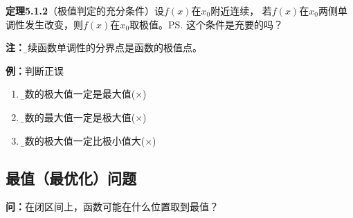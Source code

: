 \begin{center}
\end{center}

{\bf 定理5.1.2}（极值判定的充分条件）设$f(x)$在$x_0$附近连续，
若$f(x)$在$x_0$两侧单调性发生改变，则$f(x)$在$x_0$取极值。\ps{这个条件是充要的吗？}

{\bf 注：}{\b 连续函数单调性的分界点是函数的极值点。}

{\bf 例：}判断正误
\begin{enumerate}[(1)]
  \setlength{\itemindent}{1cm}
  \item {\b 函数的极大值一定是最大值\quad  ({$\times$})} 
  \item {\b 函数的最大值一定是极大值\quad  ({$\times$})} 
  \item {\b 函数的极大值一定比极小值大\quad  ({$\times$})} 
\end{enumerate}

\subsection{最值（最优化）问题}

{\bf 问：}在闭区间上，函数可能在什么位置取到最值？

